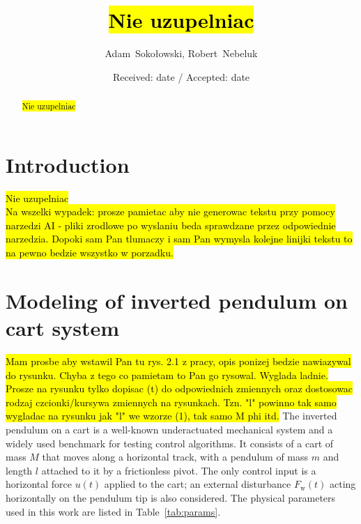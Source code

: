 \documentclass[twocolumn]{svjour3}
\begin{document}
	
	\title{\hl{Nie uzupelniac}}
	
	
	\author{Adam~Soko{\l}owski, Robert~Nebeluk}
	
	
	
	\date{Received: date / Accepted: date}

	\maketitle
	
	\begin{abstract}
		\hl{Nie uzupelniac}
	
	\end{abstract}
	
	\section{Introduction}
	\label{sec:p}
    \hl{Nie uzupelniac}\\
    \hl{Na wszelki wypadek: prosze pamietac aby nie generowac tekstu przy pomocy narzedzi AI - pliki zrodlowe po wyslaniu beda sprawdzane przez odpowiednie narzedzia. Dopoki sam Pan tlumaczy i sam Pan wymysla kolejne linijki tekstu to na pewno bedzie wszystko w porzadku.}
    \section{Modeling of inverted pendulum on cart system}
	\label{sec:pp}
    \hl{Mam prosbe aby wstawil Pan tu rys. 2.1 z pracy, opis ponizej bedzie nawiazywal do rysunku. Chyba z tego co pamietam to Pan go rysowal. Wyglada ladnie. Prosze na rysunku tylko dopisac (t) do odpowiednich zmiennych oraz dostosowac rodzaj czcionki/kursywa zmiennych na rysunkach. Tzn. "l" powinno tak samo wygladac na rysunku jak "l" we wzorze (1), tak samo M phi itd.}
The inverted pendulum on a cart is a well-known underactuated mechanical system and a widely
used benchmark for testing control algorithms. It consists of a
cart of mass $M$ that moves along a horizontal track, with a pendulum of mass $m$ and length
$l$ attached to it by a frictionless pivot. The only control input is a horizontal force $u(t)$
applied to the cart; an external disturbance $F_\mathrm{w}(t)$ acting horizontally on the
pendulum tip is also considered. The physical parameters used in this work are listed in
Table~\ref{tab:params}.
\end{document}

